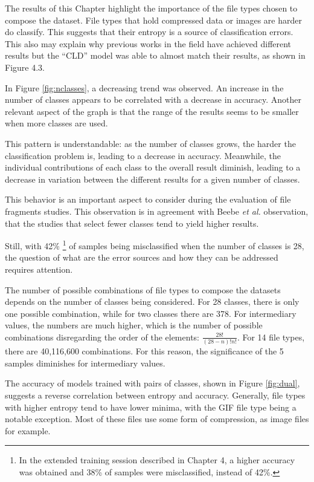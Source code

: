 The results of this Chapter highlight the importance of the file types chosen to compose the dataset. File types that hold compressed data or images are harder do classify. This suggests that their entropy is a source of classification errors. This also may explain why previous works in the field have achieved different results but the ``CLD'' model was able to almost match their results, as shown in Figure 4.3.


In Figure \ref{fig:nclasses}, a decreasing trend was observed. An increase in the number of classes appears to be correlated with a decrease in accuracy. Another relevant aspect of the graph is that the range of the results seems to be smaller when more classes are used.  

This pattern is understandable: as the number of classes grows, the harder the classification problem is, leading to a decrease in accuracy. Meanwhile, the individual contributions of each class to the overall result diminish, leading to a decrease in variation between the different results for a given number of classes.

This behavior is an important aspect to consider during the evaluation of file fragments studies. This observation is in agreement with Beebe \textit{et al.} \cite{beebe_sceadan:_2013} observation, that the studies that select fewer classes tend to yield higher results. 

Still, with 42\% \footnote{In the extended training session described in Chapter 4, a higher accuracy was obtained and 38\% of samples were misclassified, instead of 42\%.} of samples being misclassified when the number of classes is 28, the question of what are the error sources and how they can be addressed requires attention.

The number of possible combinations of file types to compose the datasets depends on the number of classes being considered. For 28 classes, there is only one possible combination, while for two classes there are 378. For intermediary values, the numbers are much higher, which is the number of possible combinations disregarding the order of the elements: $ \frac{28!}{(28-n)!n!}$. For 14 file types, there are 40,116,600 combinations. For this reason, the significance of the 5 samples diminishes for intermediary values.


The accuracy of models trained with pairs of classes, shown in Figure \ref{fig:dual}, suggests a reverse correlation between entropy and accuracy. Generally, file types with higher entropy tend to have lower minima, with the GIF file type being a notable exception. Most of these files use some form of compression, as image files for example.

